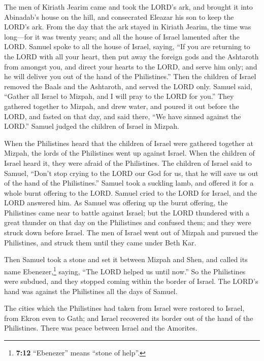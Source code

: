  The men of Kiriath Jearim came and took the LORD's ark,
and brought it into Abinadab's house on the hill, and consecrated
Eleazar his son to keep the LORD's ark.  From the day that
the ark stayed in Kiriath Jearim, the time was long---for it was twenty
years; and all the house of Israel lamented after the LORD.
 Samuel spoke to all the house of Israel, saying, ``If you
are returning to the LORD with all your heart, then put away the foreign
gods and the Ashtaroth from amongst you, and direct your hearts to the
LORD, and serve him only; and he will deliver you out of the hand of the
Philistines.''  Then the children of Israel removed the
Baals and the Ashtaroth, and served the LORD only.  Samuel
said, ``Gather all Israel to Mizpah, and I will pray to the LORD for
you.''  They gathered together to Mizpah, and drew water,
and poured it out before the LORD, and fasted on that day, and said
there, ``We have sinned against the LORD.'' Samuel judged the children
of Israel in Mizpah.

 When the Philistines heard that the children of Israel
were gathered together at Mizpah, the lords of the Philistines went up
against Israel. When the children of Israel heard it, they were afraid
of the Philistines.  The children of Israel said to
Samuel, ``Don't stop crying to the LORD our God for us, that he will
save us out of the hand of the Philistines.''  Samuel took
a suckling lamb, and offered it for a whole burnt offering to the LORD.
Samuel cried to the LORD for Israel, and the LORD answered him.
 As Samuel was offering up the burnt offering, the
Philistines came near to battle against Israel; but the LORD thundered
with a great thunder on that day on the Philistines and confused them;
and they were struck down before Israel.  The men of
Israel went out of Mizpah and pursued the Philistines, and struck them
until they came under Beth Kar.

 Then Samuel took a stone and set it between Mizpah and
Shen, and called its name Ebenezer,\footnote{\textbf{7:12} ``Ebenezer''
  means ``stone of help''.} saying, ``The LORD helped us until now.''
 So the Philistines were subdued, and they stopped coming
within the border of Israel. The LORD's hand was against the Philistines
all the days of Samuel.

 The cities which the Philistines had taken from Israel
were restored to Israel, from Ekron even to Gath; and Israel recovered
its border out of the hand of the Philistines. There was peace between
Israel and the Amorites.

